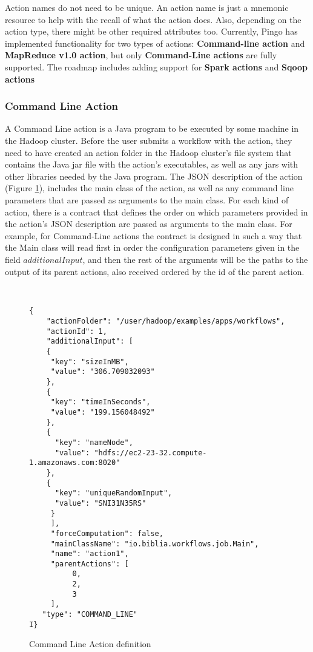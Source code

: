 Action names do not need to be unique. An action name is just a mnemonic resource to help with the recall of what the action does. Also, depending on the action type, there might be other required attributes too. Currently, Pingo has implemented functionality for two types of actions: \textbf{Command-line action} and \textbf{MapReduce v1.0 action}, but only \textbf{Command-Line actions} are fully supported. The roadmap includes adding support for \textbf{Spark actions} and \textbf{Sqoop actions}

\subsubsection{Command Line Action}
A Command Line action is a Java program to be executed by some machine in the Hadoop cluster.  Before the user submits a workflow with the action, they need to have created an action folder in the Hadoop cluster's file system that contains the Java jar file with the action's executables, as well as any jars with other libraries needed by the Java program.  The JSON description of the action (Figure \ref{fig:command_line_action_definition}), includes the main class of the action, as well as any command line parameters that are passed as arguments to the main class. For each kind of action, there is a contract that defines the order on which parameters provided in the action's JSON description are passed as arguments to the main class.  For example, for Command-Line actions the contract is designed in such a way that the Main class will read first in order the configuration parameters given in the field $additionalInput$, and then the rest of the arguments will be the paths to the output of its parent actions, also received ordered by the id of the parent action.  
\begin{figure}
\begin{mdframed}
\begin{singlespace}
\begin{verbatim}


{
    "actionFolder": "/user/hadoop/examples/apps/workflows", 
    "actionId": 1, 
    "additionalInput": [
    {
     "key": "sizeInMB",
     "value": "306.709032093"
    }, 
    {
     "key": "timeInSeconds", 
     "value": "199.156048492"
    }, 
    {
      "key": "nameNode", 
      "value": "hdfs://ec2-23-32.compute-1.amazonaws.com:8020"
    }, 
    {
      "key": "uniqueRandomInput", 
      "value": "SNI31N35RS"
     }
     ], 
     "forceComputation": false, 
     "mainClassName": "io.biblia.workflows.job.Main", 
     "name": "action1", 
     "parentActions": [
          0, 
          2, 
          3
     ], 
   "type": "COMMAND_LINE"
I}
\end{verbatim}
\end{singlespace}
\end{mdframed}
\caption{Command Line Action definition}
\label{fig:command_line_action_definition}
\end{figure}

